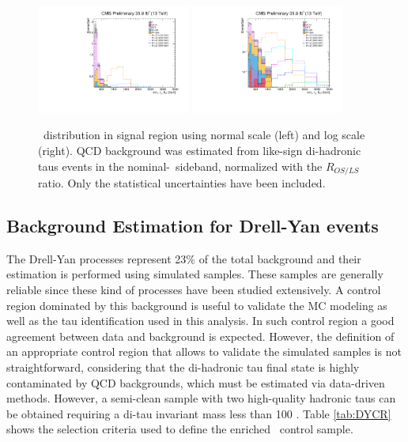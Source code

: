  \begin{figure}[H]
 \begin{center}
 \captionsetup[subfloat]{farskip=0pt,captionskip=0.0cm,labelformat=empty}
   \includegraphics[clip,width=0.45\textwidth]{figuras/Chapter5/QCD_Estimation/Result_SR.pdf}
  \includegraphics[clip,width=0.45\textwidth]{figuras/Chapter5/QCD_Estimation/Result_SR_log.pdf}
 \end{center}
 \caption{\mass~distribution in signal region using normal scale (left) and log scale (right). QCD 
 background was estimated from like-sign di-hadronic taus events in the 
 nominal-\MET~sideband, normalized with the $R_{OS/LS}$ ratio. Only the statistical uncertainties have been included.}
  \label{fig:SR_Result}	
 \end{figure}

\subsection{Background Estimation for Drell-Yan events}
\label{subsec:DY}

\noindent The Drell-Yan processes represent 23$\%$ of the total 
background and their estimation is performed 
using simulated samples. These samples are 
generally reliable since these kind of processes 
have been studied extensively. A control region 
dominated by this background is useful to 
validate the MC modeling as well as 
the tau identification used in this analysis. In such control 
region a good agreement between data and background is 
expected. However, the definition of an appropriate 
control region that allows to validate the simulated 
samples is not straightforward, considering 
that the di-hadronic tau final state is highly 
contaminated by QCD backgrounds, which must be 
estimated via data-driven methods. However,
a semi-clean sample with two high-quality 
hadronic taus can be obtained requiring a di-tau 
invariant mass less than 100 \GeV. Table \ref{tab:DYCR} shows 
the selection criteria used to define the  
enriched \Ztotauh~control sample.

